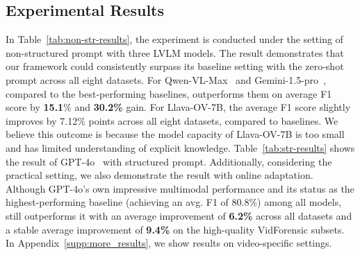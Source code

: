 \subsection{Experimental Results}
In Table~\ref{tab:non-str-results}, the experiment is conducted under the setting of non-structured prompt with three LVLM models.
The result demonstrates that our \lavid framework could consistently surpass its baseline setting with the zero-shot prompt across all eight datasets. For Qwen-VL-Max~\cite{qwen2023qwenvl} and Gemini-1.5-pro~\cite{google2024gemini}, compared to the best-performing baselines, \lavid outperforms them on average F1 score by \textbf{15.1}\% and \textbf{30.2\%} gain. 
For Llava-OV-7B, the average F1 score slightly improves by 7.12\% points across all eight datasets, compared to baselines.  
We believe this outcome is because the model capacity of Llava-OV-7B is too small and has limited understanding of explicit knowledge. 
Table~\ref{tab:str-results} shows the result of GPT-4o~\cite{openai2024gpt4o} with structured prompt. Additionally, considering the practical setting, we also demonstrate the result with online adaptation. Although GPT-4o's own impressive multimodal performance and its status as the highest-performing baseline (achieving an avg. F1 of 80.8\%) among all models, \lavid still outperforms it with an average improvement of \textbf{6.2\%} across all datasets and a stable average improvement of \textbf{9.4\%} on the high-quality VidForensic subsets.
In Appendix~\ref{supp:more_results}, we show results on video-specific settings.


